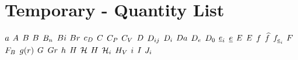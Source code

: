 \section{Temporary - Quantity List}

\begin{mdframed}

$\activity$ \newline
$\helmholtz$ \newline
$\magind$ \newline
$\exergy$ \newline
$\virialcoeff$ \newline
$\biot$ \newline
$\brinkman$ \newline
$\dragcoeff$ \newline
$\conc$ \newline
$\cp$ \newline
$\cv$ \newline
$\elecdisplace$ \newline
$\diff$ \newline
$\pdiff$ \newline
$\damkohler$ \newline
$\eneatom$ \newline
$\mbde$ \newline
$\uv$ \newline
$\mcef$ \newline
$\elecfield$ \newline
$\energy$ \newline
$\fug$ \newline
$\mixfug$ \newline
$\dforce$ \newline
$\force$ \newline
$\bodyforce$ \newline
$\raddist$ \newline
$\gibbs$ \newline
$\grashof$ \newline
$\heattranscoeff$ \newline
$\magfield$ \newline
$\surfcurv$ \newline
$\enthalpy$ \newline
$\henry$ \newline
$\energysource$ \newline
$\currentdensity$ \newline
$\mominertia$ \newline
$\molspecflux$ \newline

\end{mdframed}
